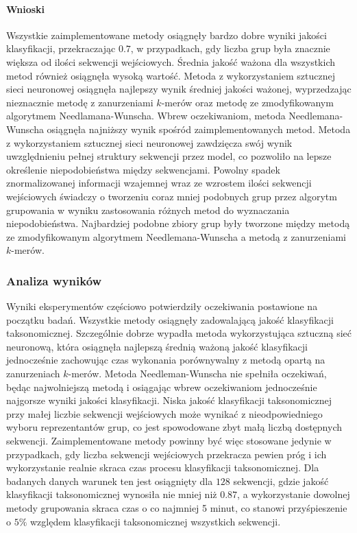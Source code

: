             \paragraph{Wnioski}
                Wszystkie zaimplementowane metody osiągnęły bardzo dobre wyniki jakości klasyfikacji, przekraczając $0.7$, w przypadkach, gdy liczba grup była znacznie większa od ilości sekwencji wejściowych. Średnia jakość ważona dla wszystkich metod również osiągnęła wysoką wartość.
                Metoda z wykorzystaniem sztucznej sieci neuronowej osiągnęła najlepszy wynik średniej jakości ważonej, wyprzedzając nieznacznie metodę z zanurzeniami $k$-merów oraz metodę ze zmodyfikowanym algorytmem Needlamana-Wunscha. Wbrew oczekiwaniom, metoda Needlemana-Wunscha osiągnęła najniższy wynik spośród zaimplementowanych metod.
                Metoda z wykorzystaniem sztucznej sieci neuronowej zawdzięcza swój wynik uwzględnieniu pełnej struktury sekwencji przez model, co pozwoliło na lepsze określenie niepodobieństwa między sekwencjami.
                Powolny spadek znormalizowanej informacji wzajemnej wraz ze wzrostem ilości sekwencji wejściowych świadczy o tworzeniu coraz mniej podobnych grup przez algorytm grupowania w wyniku zastosowania różnych metod do wyznaczania niepodobieństwa. Najbardziej podobne zbiory grup były tworzone między metodą ze zmodyfikowanym algorytmem Needlemana-Wunscha a metodą z zanurzeniami $k$-merów.

        \subsubsection{Analiza wyników}

            Wyniki eksperymentów częściowo potwierdziły oczekiwania postawione na początku badań. Wszystkie metody osiągnęły zadowalającą jakość klasyfikacji taksonomicznej. Szczególnie dobrze wypadła metoda wykorzystująca sztuczną sieć neuronową, która osiągnęła najlepszą średnią ważoną jakość klasyfikacji jednocześnie zachowując czas wykonania porównywalny z metodą opartą na zanurzeniach $k$-merów. Metoda Needleman-Wunscha nie spełniła oczekiwań, będąc najwolniejszą metodą i osiągając wbrew oczekiwaniom jednocześnie najgorsze wyniki jakości klasyfikacji. Niska jakość klasyfikacji taksonomicznej przy małej liczbie sekwencji wejściowych może wynikać z nieodpowiedniego wyboru reprezentantów grup, co jest spowodowane zbyt małą liczbą dostępnych sekwencji. Zaimplementowane metody powinny być więc stosowane jedynie w przypadkach, gdy liczba sekwencji wejściowych przekracza pewien próg i ich wykorzystanie realnie skraca czas procesu klasyfikacji taksonomicznej. Dla badanych danych warunek ten jest osiągnięty dla $128$ sekwencji, gdzie jakość klasyfikacji taksonomicznej wynosiła nie mniej niż $0.87$, a wykorzystanie dowolnej metody grupowania skraca czas o co najmniej 5 minut, co stanowi przyśpieszenie o $5\%$ względem klasyfikacji taksonomicznej wszystkich sekwencji.
